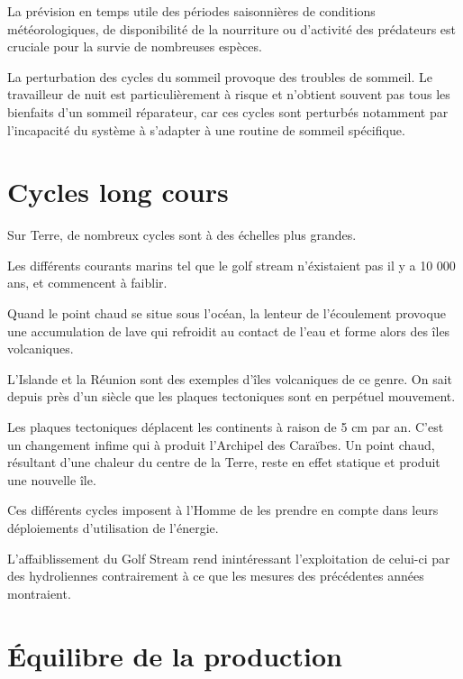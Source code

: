 La prévision en temps utile des périodes saisonnières de conditions météorologiques,
de disponibilité de la nourriture ou d'activité des prédateurs est cruciale pour
la survie de nombreuses espèces.

La perturbation des cycles du sommeil provoque des troubles de sommeil.
Le travailleur de nuit est particulièrement à risque et n’obtient souvent
pas tous les bienfaits d’un sommeil réparateur, car ces cycles sont perturbés
notamment par l’incapacité du système à s’adapter à une routine de sommeil spécifique.

\section{Cycles long cours}

Sur Terre, de nombreux cycles sont à des échelles plus grandes.

Les différents courants marins tel que le golf stream n'éxistaient pas il y a 10 000 ans, et commencent à faiblir.

Quand le point chaud se situe sous l'océan, la lenteur de l'écoulement provoque une accumulation de
lave qui refroidit au contact de l'eau et forme alors des îles volcaniques.

L'Islande et la Réunion sont des exemples d'îles volcaniques de ce genre.
On sait depuis près d'un siècle que les plaques tectoniques sont en perpétuel mouvement.

Les plaques tectoniques déplacent les continents à raison de 5 cm par an. C'est un changement infime
qui à produit l'Archipel des Caraïbes. Un point chaud, résultant d'une chaleur du centre de la Terre,
reste en effet statique et produit une nouvelle île.

Ces différents cycles imposent à l'Homme de les prendre en compte dans leurs déploiements d'utilisation de l'énergie.

L'affaiblissement du Golf Stream rend inintéressant l'exploitation de celui-ci par des hydroliennes contrairement
à ce que les mesures des précédentes années montraient.


\section{Équilibre de la production}

